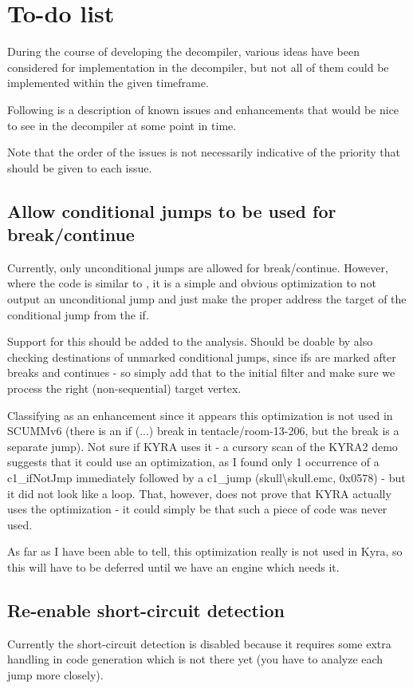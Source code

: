 \section{To-do list}
During the course of developing the decompiler, various ideas have been considered for implementation in the decompiler, but not all of them could be implemented within the given timeframe.

Following is a description of known issues and enhancements that would be nice to see in the decompiler at some point in time.

Note that the order of the issues is not necessarily indicative of the priority that should be given to each issue.

\subsection{Allow conditional jumps to be used for break/continue}
Currently, only unconditional jumps are allowed for break/continue. However, where the code is similar to , it is a simple and obvious optimization to not output an unconditional jump and just make the proper address the target of the conditional jump from the if.

Support for this should be added to the analysis. Should be doable by also checking destinations of unmarked conditional jumps, since ifs are marked after breaks and continues - so simply add that to the initial filter and make sure we process the right (non-sequential) target vertex.

Classifying as an enhancement since it appears this optimization is not used in SCUMMv6 (there is an if (...) break in tentacle/room-13-206, but the break is a separate jump). Not sure if KYRA uses it - a cursory scan of the KYRA2 demo suggests that it could use an optimization, as I found only 1 occurrence of a c1\_ifNotJmp immediately followed by a c1\_jump (skull\textbackslash skull.emc, 0x0578) - but it did not look like a loop. That, however, does not prove that KYRA actually uses the optimization - it could simply be that such a piece of code was never used.

As far as I have been able to tell, this optimization really is not used in Kyra, so this will have to be deferred until we have an engine which needs it.

\subsection{Re-enable short-circuit detection}
Currently the short-circuit detection is disabled because it requires some extra handling in code generation which is not there yet (you have to analyze each jump more closely).

